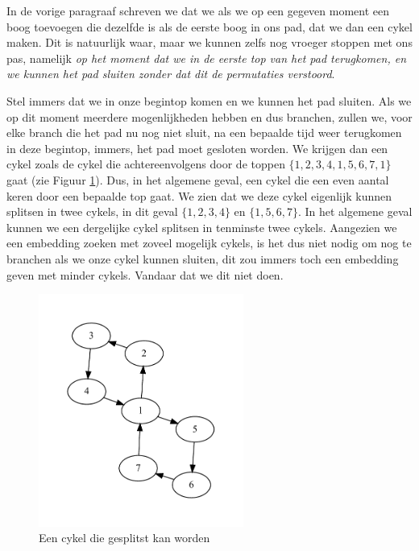 \documentclass{article}
\begin{document}
\label{sluit-pad-vroeger}
In de vorige paragraaf schreven we dat we als we op een gegeven moment een boog
toevoegen die dezelfde is als de eerste boog in ons pad, dat we dan een cykel
maken. Dit is natuurlijk waar, maar we kunnen zelfs nog vroeger stoppen met ons
pas, namelijk \emph{op het moment dat we in de eerste top van het pad
terugkomen, en we kunnen het pad sluiten zonder dat dit de permutaties
verstoord}.
\newline

Stel immers dat we in onze begintop komen en we kunnen het pad sluiten. Als
we op dit moment meerdere mogenlijkheden hebben en dus branchen, zullen we,
voor elke branch die het pad nu nog niet sluit, na een bepaalde tijd weer
terugkomen in deze begintop, immers, het pad moet gesloten worden. We krijgen
dan een cykel zoals de cykel die achtereenvolgens door de toppen
$\{1, 2, 3, 4, 1, 5, 6, 7, 1\}$ gaat (zie Figuur \ref{fig:octo}). Dus, in het
algemene geval, een cykel die een even aantal keren door een bepaalde top gaat.
We zien dat we deze cykel eigenlijk kunnen splitsen in twee cykels,
in dit geval $\{1, 2, 3, 4\}$ en $\{1, 5, 6, 7\}$. In het algemene geval kunnen
we een dergelijke cykel splitsen in tenminste twee cykels. Aangezien we een
embedding zoeken met zoveel mogelijk cykels, is het dus niet nodig om nog te
branchen als we onze cykel kunnen sluiten, dit zou immers toch een embedding
geven met minder cykels. Vandaar dat we dit niet doen.

\begin{figure}
\begin{center}
\includegraphics[width=0.6\textwidth]{images/octo.pdf}
\caption{Een cykel die gesplitst kan worden}
\label{fig:octo}
\end{center}
\end{figure}
\end{document}
